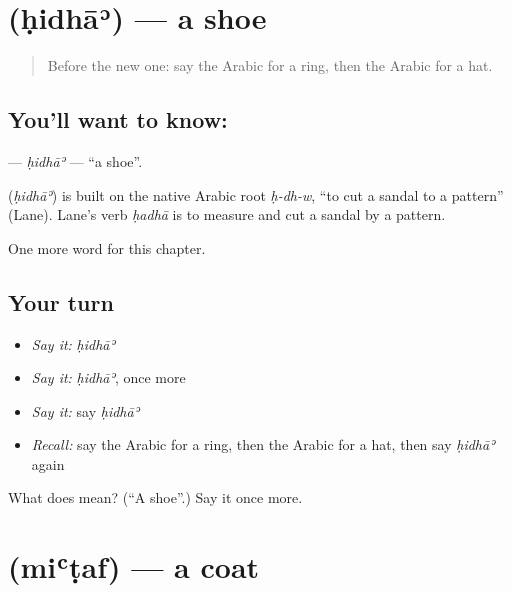 \section[\texorpdfstring{\ar{حذاء} (ḥidhāʾ)}{حذاء (ḥidhāʾ)}]{ (ḥidhāʾ) — a shoe}

\label{lesson:AR-C95-hidha}



\begin{quote}
Before the new one: say the Arabic for a ring, then the Arabic for a hat.
\end{quote}

\subsection*{You'll want to know: }
\textbf{} — \emph{ḥidhāʾ} — \textquotedblleft{}a shoe\textquotedblright{}.

\begin{cousinweb}
\textbf{} (\emph{ḥidhāʾ}) is built on the native Arabic root \emph{ḥ-dh-w}, \textquotedblleft{}to cut a sandal to a pattern\textquotedblright{} (Lane). Lane's verb \emph{ḥadhā} is to measure and cut a sandal by a pattern.
\end{cousinweb}

\begin{grammarlens}[title={What you've built}]
One more word for this chapter.
\end{grammarlens}

\subsection*{Your turn}
\begin{itemize}
\raggedright
  \item \emph{Say it:} \emph{ḥidhāʾ}
  \item \emph{Say it:} \emph{ḥidhāʾ}, once more
  \item \emph{Say it:} say \emph{ḥidhāʾ}
  \item \emph{Recall:} say the Arabic for a ring, then the Arabic for a hat, then say \emph{ḥidhāʾ} again
\end{itemize}

\begin{tcolorbox}[breakable,colback=teal!4,colframe=teal!35!black,title={Before you move on}]
What does  mean? (\textquotedblleft{}A shoe\textquotedblright{}.) Say it once more.
\end{tcolorbox}
\section[\texorpdfstring{\ar{معطف} (miʿṭaf)}{معطف (miʿṭaf)}]{ (miʿṭaf) — a coat}

